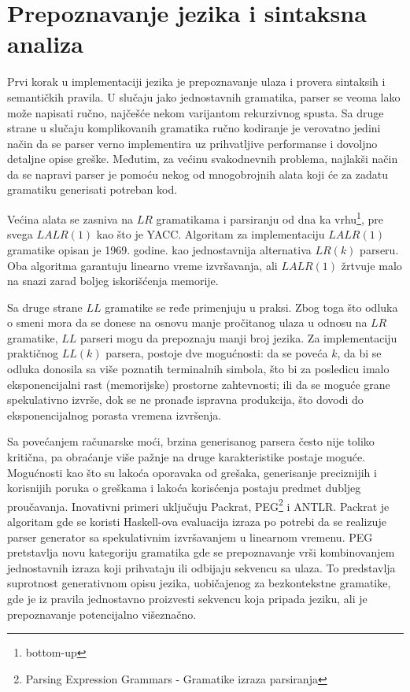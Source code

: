 \chapter{Prepoznavanje jezika i sintaksna analiza}
\label{ch:prepoznavanje}

Prvi korak u implementaciji jezika je prepoznavanje ulaza i provera sintaksih i semantičkih pravila. 
U slučaju jako jednostavnih gramatika, parser se veoma lako može napisati ručno, najčešće nekom varijantom rekurzivnog spusta. 
Sa druge strane u slučaju komplikovanih gramatika ručno kodiranje je verovatno jedini način da se parser verno implementira uz prihvatljive performanse i dovoljno detaljne opise greške.
Međutim, za većinu svakodnevnih problema, najlakši način da se napravi parser je pomoću nekog od mnogobrojnih alata koji će za zadatu gramatiku generisati potreban kod. 

Većina alata se zasniva na $LR$\cite{lr} gramatikama i parsiranju od dna ka vrhu\footnote{\eng bottom-up}, pre svega $LALR(1)$ kao što je YACC\cite{yacc}.
Algoritam za implementaciju $LALR(1)$ gramatike opisan je 1969. godine. kao jednostavnija alternativa $LR(k)$ parseru.
Oba algoritma garantuju linearno vreme izvršavanja, ali $LALR(1)$ žrtvuje malo na snazi zarad boljeg iskorišćenja memorije.

Sa druge strane $LL$ gramatike se ređe primenjuju u praksi.
Zbog toga što odluka o smeni mora da se donese na osnovu manje pročitanog ulaza u odnosu na $LR$ gramatike, $LL$ parseri mogu da prepoznaju manji broj jezika.
Za implementaciju praktičnog $LL(k)$ parsera, postoje dve mogućnosti: da se poveća $k$, da bi se odluka donosila sa više poznatih terminalnih simbola, što bi za posledicu imalo eksponencijalni rast (memorijske) prostorne zahtevnosti; ili da se moguće grane spekulativno izvrše, dok se ne pronađe ispravna produkcija, što dovodi do eksponencijalnog porasta vremena izvršenja.

Sa povećanjem računarske moći, brzina generisanog parsera često nije toliko kritična, pa obraćanje više pažnje na druge karakteristike postaje moguće.
Mogućnosti kao što su lakoća oporavaka od grešaka, generisanje preciznijih i korisnijih poruka o greškama i lakoća korisćenja postaju predmet dubljeg proučavanja.
Inovativni primeri uključuju Packrat\cite{packrat}, PEG\cite{peg}\footnote{\skr \eng Parsing Expression Grammars - Gramatike izraza parsiranja} i ANTLR.
Packrat je algoritam gde se koristi Haskell-ova evaluacija izraza po potrebi da se realizuje parser generator sa spekulativnim izvršavanjem u linearnom vremenu.
PEG pretstavlja novu kategoriju gramatika gde se prepoznavanje vrši kombinovanjem jednostavnih izraza koji prihvataju ili odbijaju sekvencu sa ulaza.
To predstavlja suprotnost generativnom opisu jezika, uobičajenog za bezkontekstne gramatike, gde je iz pravila jednostavno proizvesti sekvencu koja pripada jeziku, ali je prepoznavanje potencijalno višeznačno.

